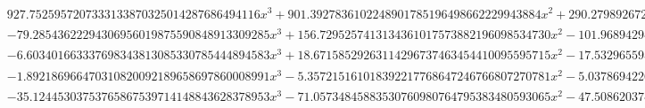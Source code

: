 \documentclass{article}
\begin{document}
\begin{landscape}
\begin{eqnarray*}
\begin{array}{cc}
\begin{array}{cc}
 927.7525957207333133870325014287686494116 x^3+901.3927836102248901785196498662229943884 x^2+290.2798926723790049663569518486582861734 x+31.24010426928658894374350566354991716661 & x\geq -\frac{3}{8}\land x<-\frac{1}{4} \\
 -79.28543622294306956019875590848913309285 x^3+156.7295257413134361017573882196098534730 x^2-101.9689429489385666772333245092339496698 x+21.79690680867250420401335327506633410337 & x\geq \frac{1}{2}\land x<\frac{3}{4} \\
 -6.603401663337698343813085330785444894583 x^3+18.67158529263114296737463454410095595715 x^2-17.53296559524919090331001309584557723055 x+5.464781965955746279748463882530066167983 & x\geq \frac{3}{4}\land x<1 \\
 -1.892186966470310820092189658697860008991 x^3-5.357215161018392217768647246766807270781 x^2-5.037869422625851975260725517440034514589 x-1.572841228077770577584267929371087252799 & x\geq -1\land x<-\frac{3}{4} \\
 -35.12445303753765867539714148843628378953 x^3-71.05734845883530760980764795383480593065 x^2-47.50862037442507555749212036535844237473 x-10.48944171063671073269265272075504143415 & x\geq -\frac{3}{4}\land x<-\frac{1}{2}
\end{array}

\end{array}\end{eqnarray*}
\end{landscape}
\end{document}
